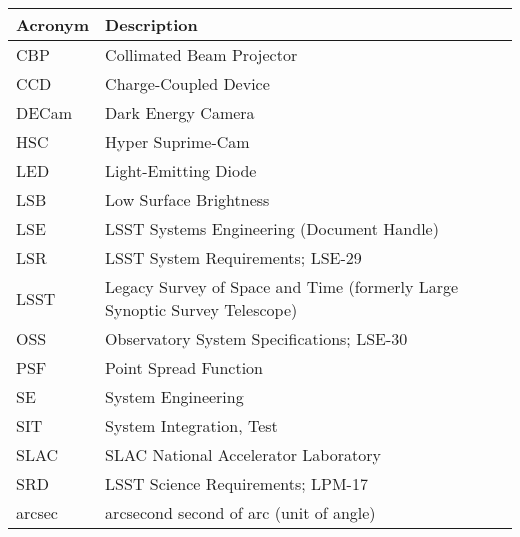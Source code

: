 \addtocounter{table}{-1}
\begin{longtable}{p{}p{}}\hline
\textbf{Acronym} & \textbf{Description}  \\\hline

CBP & Collimated Beam Projector \\\hline
CCD & Charge-Coupled Device \\\hline
DECam & Dark Energy Camera \\\hline
HSC & Hyper Suprime-Cam \\\hline
LED & Light-Emitting Diode \\\hline
LSB & Low Surface Brightness \\\hline
LSE & LSST Systems Engineering (Document Handle) \\\hline
LSR & LSST System Requirements; LSE-29 \\\hline
LSST & Legacy Survey of Space and Time (formerly Large Synoptic Survey Telescope) \\\hline
OSS & Observatory System Specifications; LSE-30 \\\hline
PSF & Point Spread Function \\\hline
SE & System Engineering \\\hline
SIT & System Integration, Test \\\hline
SLAC & SLAC National Accelerator Laboratory \\\hline
SRD & LSST Science Requirements; LPM-17 \\\hline
arcsec & arcsecond second of arc (unit of angle) \\\hline
\end{longtable}
